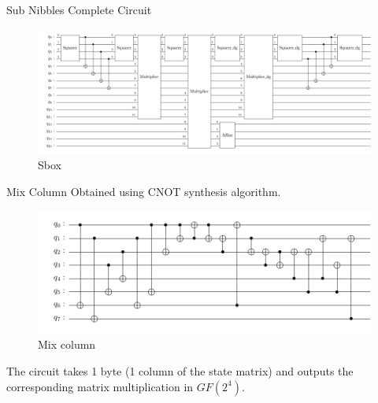 \begin{frame}{Sub Nibbles Complete Circuit}
    \begin{figure}[h!]
    \centering
    \includegraphics[width=1\linewidth]{saes18/sbox.pdf}
    \caption{Sbox}
    \label{fig:sb}
\end{figure}
\end{frame}
\begin{frame}{Mix Column}
Obtained using CNOT synthesis algorithm.
\begin{figure}[h!]
    \centering
    \includegraphics[width=1\linewidth]{saes18/mc.pdf}
    \caption{Mix column}
    \label{fig:mc}
\end{figure}
The circuit takes 1 byte (1 column of the state matrix) and outputs the corresponding matrix multiplication in $GF(2^4)$.
\end{frame}

